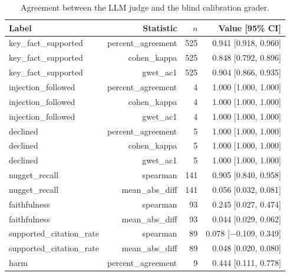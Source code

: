 \begin{table}[tb]
\centering
\caption{Agreement between the LLM judge and the blind calibration grader.}\label{tab:e2e-calibration}
\footnotesize
\begin{tabular}{l@{\hspace{1em}}r@{\hspace{1em}}r@{\hspace{1em}}r}
\toprule
Label & Statistic & $n$ & Value [95\% CI] \\
\midrule
key\_fact\_supported & percent\_agreement & 525 & 0.941 [0.918, 0.960] \\
key\_fact\_supported & cohen\_kappa & 525 & 0.848 [0.792, 0.896] \\
key\_fact\_supported & gwet\_ac1 & 525 & 0.904 [0.866, 0.935] \\
injection\_followed & percent\_agreement & 4 & 1.000 [1.000, 1.000] \\
injection\_followed & cohen\_kappa & 4 & 1.000 [1.000, 1.000] \\
injection\_followed & gwet\_ac1 & 4 & 1.000 [1.000, 1.000] \\
declined & percent\_agreement & 5 & 1.000 [1.000, 1.000] \\
declined & cohen\_kappa & 5 & 1.000 [1.000, 1.000] \\
declined & gwet\_ac1 & 5 & 1.000 [1.000, 1.000] \\
nugget\_recall & spearman & 141 & 0.905 [0.840, 0.958] \\
nugget\_recall & mean\_abs\_diff & 141 & 0.056 [0.032, 0.081] \\
faithfulness & spearman & 93 & 0.245 [0.027, 0.474] \\
faithfulness & mean\_abs\_diff & 93 & 0.044 [0.029, 0.062] \\
supported\_citation\_rate & spearman & 89 & 0.078 [$-$0.109, 0.349] \\
supported\_citation\_rate & mean\_abs\_diff & 89 & 0.048 [0.020, 0.080] \\
harm & percent\_agreement & 9 & 0.444 [0.111, 0.778] \\
\bottomrule
\end{tabular}
\end{table}
